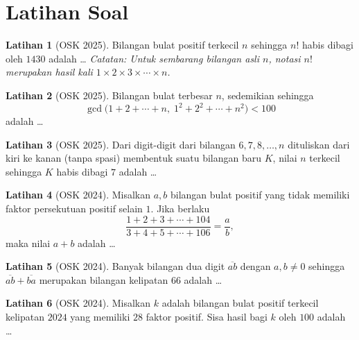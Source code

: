 \documentclass[aspectratio=169]{beamer}
\theoremstyle{definition}
\newtheorem{latihan}{Latihan}
\begin{document}
\section*{Latihan Soal}
\begin{frame}{\insertsection}
  \begin{latihan}[OSK 2025]
    Bilangan bulat positif terkecil $n$ sehingga $n!$ habis dibagi oleh $1430$ adalah \ldots
    \textit{Catatan: Untuk sembarang bilangan asli $n$, notasi $n!$ merupakan hasil kali $1 \times 2 \times 3 \times \cdots \times n$.}
  \end{latihan}

  \begin{latihan}[OSK 2025]
    Bilangan bulat terbesar $n$, sedemikian sehingga
    \[
      \gcd\big(1 + 2 + \cdots + n,\; 1^2 + 2^2 + \cdots + n^2\big) < 100
    \]
    adalah \ldots
  \end{latihan}

  \begin{latihan}[OSK 2025]
    Dari digit-digit dari bilangan $6,7,8,\ldots,n$ dituliskan dari kiri ke kanan (tanpa spasi) membentuk suatu bilangan baru $K$, nilai $n$ terkecil sehingga $K$ habis dibagi $7$ adalah \ldots
  \end{latihan}
\end{frame}

\begin{frame}{\insertsection}
  \begin{latihan}[OSK 2024]
    Misalkan $a,b$ bilangan bulat positif yang tidak memiliki faktor persekutuan positif selain $1$. Jika berlaku
    \[
      \frac{1+2+3+\cdots+104}{3+4+5+\cdots+106} = \frac{a}{b},
    \]
    maka nilai $a+b$ adalah \ldots
  \end{latihan}
  \begin{latihan}[OSK 2024]
    Banyak bilangan dua digit $\overline{ab}$ dengan $a,b \neq 0$ sehingga $\overline{ab} + \overline{ba}$ merupakan bilangan kelipatan $66$ adalah \ldots
  \end{latihan}
  \begin{latihan}[OSK 2024]
    Misalkan $k$ adalah bilangan bulat positif terkecil kelipatan $2024$ yang memiliki $28$ faktor positif. Sisa hasil bagi $k$ oleh $100$ adalah \ldots
  \end{latihan}
\end{frame}
\end{document}
